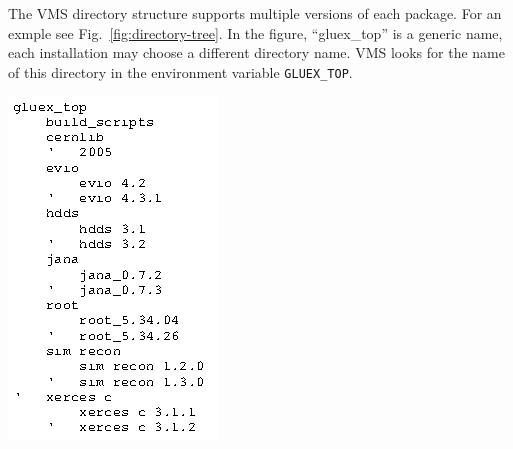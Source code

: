 The VMS directory structure supports multiple versions of each package. For an exmple see Fig.~\ref{fig:directory-tree}. In the figure, ``gluex\_top'' is a generic name, each installation may choose a different directory name. VMS looks for the name of this directory in the environment variable {\tt GLUEX\_TOP}.

\includegraphics{tree.png}
